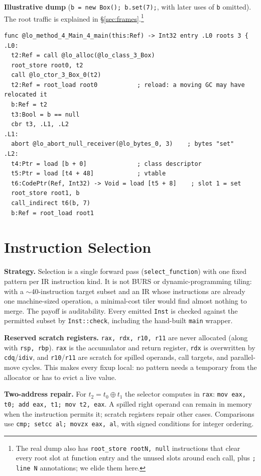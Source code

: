 \documentclass[10pt]{article}
\newcommand{\code}[1]{\texttt{\small #1}}
\begin{document}
\textbf{Illustrative dump} (\code{b = new Box(); b.set(7);}, with later uses of \code{b} omitted). The root traffic is explained in \S\ref{sec:frames}.\footnote{The real dump also has \code{root\_store rootN, null} instructions that clear every root slot at function entry and the unused slots around each call, plus \code{; line N} annotations; we elide them here.}
\begin{lstlisting}
func @lo_method_4_Main_4_main(this:Ref) -> Int32 entry .L0 roots 3 {
.L0:
  t2:Ref = call @lo_alloc(@lo_class_3_Box)
  root_store root0, t2
  call @lo_ctor_3_Box_0(t2)
  t2:Ref = root_load root0           ; reload: a moving GC may have relocated it
  b:Ref = t2
  t3:Bool = b == null
  cbr t3, .L1, .L2
.L1:
  abort @lo_abort_null_receiver(@lo_bytes_0, 3)    ; bytes "set"
.L2:
  t4:Ptr = load [b + 0]              ; class descriptor
  t5:Ptr = load [t4 + 48]            ; vtable
  t6:CodePtr(Ref, Int32) -> Void = load [t5 + 8]    ; slot 1 = set
  root_store root1, b
  call_indirect t6(b, 7)
  b:Ref = root_load root1
\end{lstlisting}

\section{Instruction Selection}
\textbf{Strategy.} Selection is a single forward pass (\code{select\_function}) with one fixed pattern per IR instruction kind. It is not BURS or dynamic-programming tiling: with a $\sim$40-instruction target subset and an IR whose instructions are already one machine-sized operation, a minimal-cost tiler would find almost nothing to merge. The payoff is auditability. Every emitted \code{Inst} is checked against the permitted subset by \code{Inst::check}, including the hand-built \code{main} wrapper.

\textbf{Reserved scratch registers.} \code{rax, rdx, r10, r11} are never allocated (along with \code{rsp, rbp}). \code{rax} is the accumulator and return register, \code{rdx} is overwritten by \code{cdq}/\code{idiv}, and \code{r10}/\code{r11} are scratch for spilled operands, call targets, and parallel-move cycles. This makes every fixup local: no pattern needs a temporary from the allocator or has to evict a live value.

\textbf{Two-address repair.} For $t_2 = t_0 \oplus t_1$ the selector computes in \code{rax}: \code{mov eax, t0; add eax, t1; mov t2, eax}. A spilled right operand can remain in memory when the instruction permits it; scratch registers repair other cases. Comparisons use \code{cmp; setcc al; movzx eax, al}, with signed conditions for integer ordering.
\end{document}
